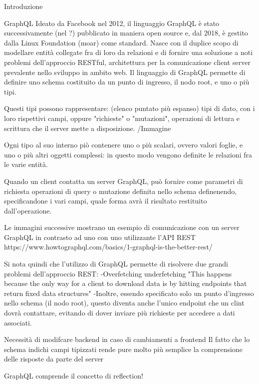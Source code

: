 Introduzione

    GraphQL
        Ideato da Facebook nel 2012, il linguaggio GraphQL è stato successivamente (nel ?) pubblicato in maniera open source e, dal 2018, è gestito dalla Linux Foundation (moar) come standard.
        Nasce con il duplice scopo di modellare entità collegate fra di loro da relazioni e di fornire una soluzione a noti problemi dell'approccio RESTful, architettura per la comunicazione client server prevalente nello sviluppo in ambito web.
        Il linguaggio di GraphQL permette di definire uno schema costituito da un punto di ingresso, il nodo root, e uno o più tipi.
        
        Questi tipi possono rappresentare: (elenco puntato più espanso) tipi di dato, con i loro rispettivi campi, oppure "richieste" o "mutazioni", operazioni di lettura e scrittura che il server mette a disposizione.
            /Immagine
        
        Ogni tipo al suo interno piò contenere uno o più scalari, ovvero valori foglie, e uno o più altri oggetti complessi: in questo modo vengono definite le relazioni fra le varie entità.

        Quando un client contatta un server GraphQL, può fornire come parametri di richiesta operazioni di query o mutazione definita nello schema definenendo, specificandone i vari campi, quale forma avrà il risultato restituito dall'operazione.

        Le immagini successive mostrano un esempio di comunicazione con un server GraphQL in contrasto ad uno con uno utilizzante l'API REST
        https://www.howtographql.com/basics/1-graphql-is-the-better-rest/


        Si nota quindi che l'utilizzo di GraphQL permette di risolvere due grandi problemi dell'approccio REST:
            -Overfetching underfetching "This happens because the only way for a client to download data is by hitting endpoints that return fixed data structures"
            -Inoltre, essendo specificato solo un punto d'ingresso nello schema (il nodo root), questo diventa anche l'unico endpoint che un clint dovrà contattare, evitando di dover inviare più richieste per accedere a dati associati. 
        
        Necessità di modifcare backend in caso di cambiamenti a frontend
        Il fatto che lo schema indichi campi tipizzati rende pure molto più semplice la comprensione delle risposte da parte del server

        GraphQL comprende il concetto di reflection!


